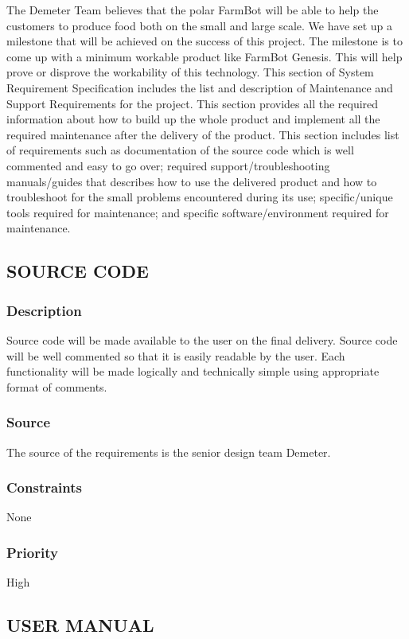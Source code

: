 The Demeter Team believes that the polar FarmBot will be able to help the customers to produce food both on the small and large scale. We have set up a milestone that will be achieved on the success of this project. The milestone is to come up with a minimum workable product like FarmBot Genesis. This will help prove or disprove the workability of this technology.
This section of System Requirement Specification includes the list and description of Maintenance and Support Requirements for the project. This section provides all the required information about how to build up the whole product and implement all the required maintenance after the delivery of the product. This section includes list of requirements such as documentation of the source code which is well commented and easy to go over; required support/troubleshooting manuals/guides that describes how to use the delivered product and how to troubleshoot for the small problems encountered during its use; specific/unique tools required for maintenance; and specific software/environment required for maintenance.

\subsection{SOURCE CODE}
\subsubsection{Description}
Source code will be made available to the user on the final delivery. Source code will be well commented so that it is easily readable by the user. Each functionality will be made logically and technically simple using appropriate format of comments.
\subsubsection{Source}
The source of the requirements is the senior design team Demeter.
\subsubsection{Constraints}
None
\subsubsection{Priority}
High

\subsection{USER MANUAL}
